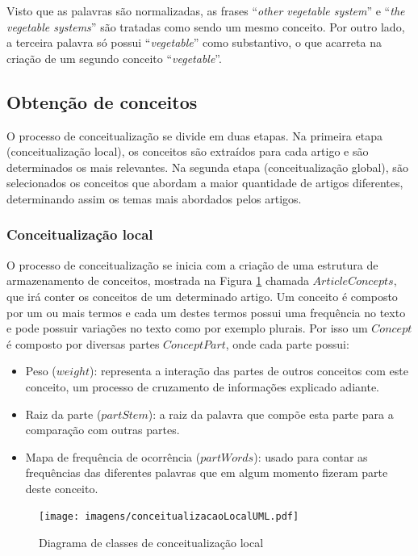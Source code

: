 \begin{enumerate}
Visto que as palavras são normalizadas, as frases “\emph{other vegetable system}” e “\emph{the vegetable systems}” são tratadas como sendo um mesmo conceito. Por outro lado, a terceira palavra só possui “\emph{vegetable}” como substantivo, o que acarreta na criação de um segundo conceito “\emph{vegetable}”.
\end{enumerate}



\subsection{Obtenção de conceitos}
O processo de conceitualização se divide em duas etapas. Na primeira etapa (conceitualização local), os conceitos são extraídos para cada artigo e são determinados os mais relevantes. Na segunda etapa (conceitualização global), são selecionados os conceitos que abordam a maior quantidade de artigos diferentes, determinando assim os temas mais abordados pelos artigos.

\subsubsection{Conceitualização local}
O processo de conceitualização se inicia com a criação de uma estrutura de armazenamento de conceitos, mostrada na Figura \ref{fig:conceitualizacaoLocalUML} chamada $ArticleConcepts$, que irá conter os conceitos de um determinado artigo. Um conceito é composto por um ou mais termos e cada um destes termos possui uma frequência no texto e pode possuir variações no texto como por exemplo plurais. Por isso um $Concept$ é composto por diversas partes $ConceptPart$, onde cada parte possui:
\begin{itemize}
    \item Peso ($weight$): representa a interação das partes de outros conceitos com este conceito, um processo de cruzamento de informações explicado adiante.
    \item Raiz da parte ($partStem$): a raiz da palavra que compõe esta parte para a comparação com outras partes.
    \item Mapa de frequência de ocorrência ($partWords$): usado para contar as frequências das diferentes palavras que em algum momento fizeram parte deste conceito.
\end{itemize}

\begin{figure}[h!]
    \center
    \texttt{[image: imagens/conceitualizacaoLocalUML.pdf]}
    \caption{Diagrama de classes de conceitualização local \label{fig:conceitualizacaoLocalUML}}
\end{figure}

